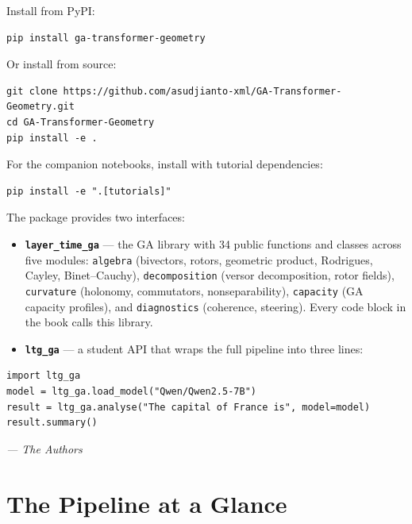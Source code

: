 \documentclass[11pt, twoside, openright]{memoir}
\numberwithin{equation}{chapter}
\begin{document}
\noindent Install from PyPI:
\begin{lstlisting}
pip install ga-transformer-geometry
\end{lstlisting}

\noindent Or install from source:
\begin{lstlisting}
git clone https://github.com/asudjianto-xml/GA-Transformer-Geometry.git
cd GA-Transformer-Geometry
pip install -e .
\end{lstlisting}

\noindent For the companion notebooks, install with tutorial dependencies:
\begin{lstlisting}
pip install -e ".[tutorials]"
\end{lstlisting}

The package provides two interfaces:

\begin{itemize}[nosep]
\item \textbf{\texttt{layer\_time\_ga}} --- the GA library with 34 public
  functions and classes across five modules: \texttt{algebra} (bivectors,
  rotors, geometric product, Rodrigues, Cayley, Binet--Cauchy),
  \texttt{decomposition} (versor decomposition, rotor fields),
  \texttt{curvature} (holonomy, commutators, nonseparability),
  \texttt{capacity} (GA capacity profiles), and \texttt{diagnostics}
  (coherence, steering).  Every code block in the book calls this library.

\item \textbf{\texttt{ltg\_ga}} --- a student API that wraps the full
  pipeline into three lines:
\end{itemize}

\begin{lstlisting}[caption={Three lines to GA}]
import ltg_ga
model = ltg_ga.load_model("Qwen/Qwen2.5-7B")
result = ltg_ga.analyse("The capital of France is", model=model)
result.summary()
\end{lstlisting}

\vspace{1em}
\hfill\emph{--- The Authors}

\clearpage
\pagestyle{ruled}
\tableofcontents*
\clearpage

\mainmatter


\chapter*{The Pipeline at a Glance}
\end{document}
